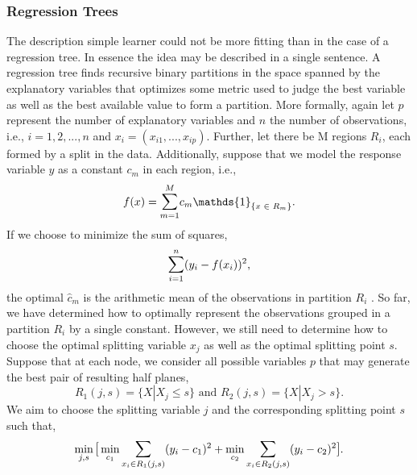 \documentclass[a4paper,12pt, headsepline]{scrartcl}
\DeclareMathOperator*{\minA}{min}
\numberwithin{equation}{section}
\begin{document}
\subsubsection{Regression Trees}\label{subsubsec:trees}
The description simple learner could not be more fitting than in the case of a regression tree. In essence the idea may be described in a single sentence. A regression tree finds recursive binary partitions in the space spanned by the explanatory variables that optimizes some metric used to judge the best variable as well as the best available value to form a partition. More formally, again let $p$ represent the number of explanatory variables and $n$ the number of observations, i.e., $i = 1, 2, ..., n$ and $x_i = (x_{i1}, ..., x_{ip})$. Further, let there be M regions $R_i$, each formed by a split in the data. Additionally, suppose that we model the response variable $y$ as a constant $c_m$ in each region, i.e.,
\[
f(x) = \mathlarger{\sum}\limits_{m = 1}^{M} c_m \mathds{1}_{\{x \text{ } \in \text{ } R_m\}}.
\]
If we choose to minimize the sum of squares, 
\[
\mathlarger{\sum}\limits_{i = 1}^{n}(y_i - f(x_i))^2,
\]
the optimal $\hat c_m$ is the arithmetic mean of the observations in partition $R_i$ \citep{hastie09}. So far, we have determined how to optimally represent the observations grouped in a partition $R_i$ by a single constant. However, we still need to determine how to choose the optimal splitting variable $x_j$ as well as the optimal splitting point $s$. Suppose that at each node, we consider all possible variables $p$ that may generate the best pair of resulting half planes,
\[
R_1(j, s) = \{X|X_j \leq s\} \text{ and } R_2(j, s) = \{X|X_j > s\}.
\]
We aim to choose the splitting variable $j$ and the corresponding splitting point $s$ such that,
\[
\minA_{j, s}\mathlarger{[} \minA_{c_1} \mathlarger{\sum}\limits_{x_i \in R_1(j, s)} (y_i - c_1)^2 + \minA_{c_2} \mathlarger{\sum}\limits_{x_i \in R_2(j, s)} (y_i - c_2)^2 \mathlarger{]}.
\]
\end{document}
